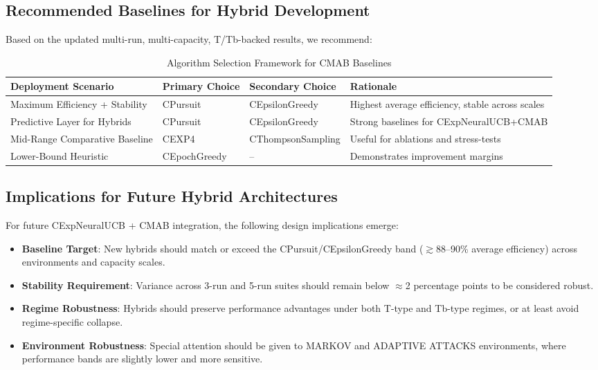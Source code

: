 \documentclass[12pt,a4paper]{article}
\begin{document}
\subsection{Recommended Baselines for Hybrid Development}

Based on the updated multi-run, multi-capacity, T/Tb-backed results, we recommend:

\begin{table}[H]
\footnotesize
\centering
\caption{Algorithm Selection Framework for CMAB Baselines}
\begin{tabular}{|l|l|l|l|}
\hline
\textbf{Deployment Scenario} & \textbf{Primary Choice} & \textbf{Secondary Choice} & \textbf{Rationale} \\
\hline
\hline
Maximum Efficiency + Stability & CPursuit & CEpsilonGreedy & Highest average efficiency, stable across scales \\
Predictive Layer for Hybrids   & CPursuit & CEpsilonGreedy & Strong baselines for CExpNeuralUCB+CMAB \\
Mid-Range Comparative Baseline & CEXP4    & CThompsonSampling & Useful for ablations and stress-tests \\
Lower-Bound Heuristic          & CEpochGreedy & --           & Demonstrates improvement margins \\
\hline
\end{tabular}
\end{table}

\subsection{Implications for Future Hybrid Architectures}

For future CExpNeuralUCB + CMAB integration, the following design implications emerge:

\begin{itemize}
\item \textbf{Baseline Target}: New hybrids should match or exceed the CPursuit/CEpsilonGreedy band ($\gtrsim$88–90\% average efficiency) across environments and capacity scales.
\item \textbf{Stability Requirement}: Variance across 3-run and 5-run suites should remain below $\approx$2 percentage points to be considered robust.
\item \textbf{Regime Robustness}: Hybrids should preserve performance advantages under both T-type and Tb-type regimes, or at least avoid regime-specific collapse.
\item \textbf{Environment Robustness}: Special attention should be given to MARKOV and ADAPTIVE ATTACKS environments, where performance bands are slightly lower and more sensitive.
\end{itemize}
\end{document}

